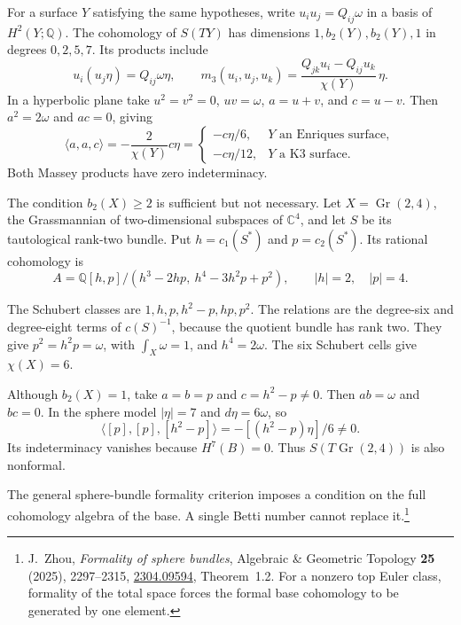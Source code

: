 For a surface $Y$ satisfying the same hypotheses, write
$u_i u_j=Q_{ij}\omega$ in a basis of
$H^2(Y;\mathbb Q)$. The cohomology of $S(TY)$ has dimensions
$1,b_2(Y),b_2(Y),1$ in degrees $0,2,5,7$. Its products include
\begin{equation}\label{df:eq:surface-products}
 u_i(u_j\eta)=Q_{ij}\omega\eta,\qquad
 m_3(u_i,u_j,u_k)
       =\frac{Q_{jk}u_i-Q_{ij}u_k}{\chi(Y)}\,\eta.
\end{equation}
In a hyperbolic plane take $u^2=v^2=0$, $uv=\omega$,
$a=u+v$, and $c=u-v$. Then $a^2=2\omega$ and $ac=0$, giving
\[
 \langle a,a,c\rangle=-\frac{2}{\chi(Y)}c\eta
 =\begin{cases}
   -c\eta/6,&Y\text{ an Enriques surface},\\
   -c\eta/12,&Y\text{ a K3 surface}.
  \end{cases}
\]
Both Massey products have zero indeterminacy.

\begin{example}\label{df:ex:grassmannian}
The condition $b_2(X)\geq2$ is sufficient but not necessary.
Let $X=\operatorname{Gr}(2,4)$, the Grassmannian of two-dimensional
subspaces of $\mathbb C^4$, and let $S$ be its tautological rank-two
bundle. Put $h=c_1(S^*)$ and $p=c_2(S^*)$. Its rational cohomology is
\[
 A=\mathbb Q[h,p]/(h^3-2hp,\ h^4-3h^2p+p^2),
 \qquad |h|=2,\quad |p|=4.
\]

The Schubert classes are $1,h,p,h^2-p,hp,p^2$.
The relations are the degree-six and degree-eight terms of
$c(S)^{-1}$, because the quotient bundle has rank two.
They give $p^2=h^2p=\omega$, with $\int_X\omega=1$, and
$h^4=2\omega$. The six Schubert cells give $\chi(X)=6$.

Although $b_2(X)=1$, take $a=b=p$ and $c=h^2-p\ne0$.
Then $ab=\omega$ and $bc=0$. In the sphere model
$|\eta|=7$ and $d\eta=6\omega$, so
\[
 \langle[p],[p],[h^2-p]\rangle
       =-[(h^2-p)\eta]/6\ne0.
\]
Its indeterminacy vanishes because $H^7(B)=0$.
Thus $S(T\operatorname{Gr}(2,4))$ is also nonformal.
\end{example}

The general sphere-bundle formality criterion imposes a condition on
the full cohomology algebra of the base. A single Betti number cannot
replace it.\footnote{J.~Zhou, \emph{Formality of sphere bundles},
Algebraic \& Geometric Topology \textbf{25} (2025), 2297--2315,
\href{https://arxiv.org/abs/2304.09594}{2304.09594}, Theorem~1.2.
For a nonzero top Euler class, formality of the total space forces
the formal base cohomology to be generated by one element.}

